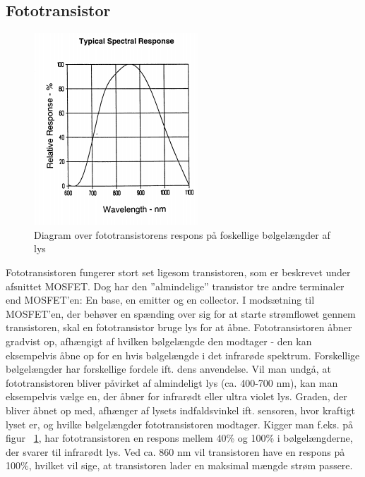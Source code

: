 \subsection{Fototransistor}

\begin{figure}[h]
	\begin{center}
	\includegraphics[scale=0.4]{Billeder/Fototransistor_respons.png}
	\caption[caption]{Diagram over fototransistorens respons på foskellige bølgelængder af lys\label{fig:OP598}\\\hspace{\textwidth}}
	\end{center}
\end{figure}
Fototransistoren fungerer stort set ligesom transistoren, som er beskrevet under afsnittet MOSFET. Dog har den ”almindelige” transistor tre andre terminaler end MOSFET’en: En base, en emitter og en collector. I modsætning til MOSFET’en, der behøver en spænding over sig for at starte strømflowet gennem transistoren, skal en fototransistor bruge lys for at åbne. Fototransistoren åbner gradvist op, afhængigt af hvilken bølgelængde den modtager - den kan eksempelvis åbne op for en hvis bølgelængde i det infrarøde spektrum. Forskellige bølgelængder har forskellige fordele ift. dens anvendelse. Vil man undgå, at fototransistoren bliver påvirket af almindeligt lys (ca. 400-700 nm), kan man eksempelvis vælge en, der åbner for infrarødt eller ultra violet lys. Graden, der bliver åbnet op med, afhænger af lysets indfaldsvinkel ift. sensoren, hvor kraftigt lyset er, og hvilke bølgelængder fototransistoren modtager. Kigger man f.eks. på figur ~\ref{fig:OP598}, har fototransistoren en respons mellem 40\% og 100\% i bølgelængderne, der svarer til infrarødt lys. Ved ca. 860 nm vil transistoren have en respons på 100\%, hvilket vil sige, at transistoren lader en maksimal mængde strøm passere.


